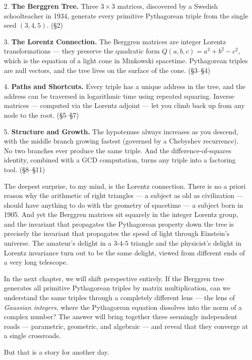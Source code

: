 \documentclass[12pt, letterpaper, openany]{book}
\theoremstyle{definition}
\theoremstyle{remark}
\begin{document}
2. \textbf{The Berggren Tree.} Three $3 \times 3$ matrices, discovered by a Swedish schoolteacher in 1934, generate every primitive Pythagorean triple from the single seed $(3, 4, 5)$. (§2)

3. \textbf{The Lorentz Connection.} The Berggren matrices are integer Lorentz transformations --- they preserve the quadratic form $Q(a, b, c) = a^2 + b^2 - c^2$, which is the equation of a light cone in Minkowski spacetime. Pythagorean triples are null vectors, and the tree lives on the surface of the cone. (§3--§4)

4. \textbf{Paths and Shortcuts.} Every triple has a unique address in the tree, and the address can be traversed in logarithmic time using repeated squaring. Inverse matrices --- computed via the Lorentz adjoint --- let you climb back up from any node to the root. (§5--§7)

5. \textbf{Structure and Growth.} The hypotenuse always increases as you descend, with the middle branch growing fastest (governed by a Chebyshev recurrence). No two branches ever produce the same triple. And the difference-of-squares identity, combined with a GCD computation, turns any triple into a factoring tool. (§8--§11)

The deepest surprise, to my mind, is the Lorentz connection. There is no a priori reason why the arithmetic of right triangles --- a subject as old as civilization --- should have anything to do with the geometry of spacetime --- a subject born in 1905. And yet the Berggren matrices sit squarely in the integer Lorentz group, and the invariant that propagates the Pythagorean property down the tree is precisely the invariant that propagates the speed of light through Einstein's universe. The amateur's delight in a $3$-$4$-$5$ triangle and the physicist's delight in Lorentz invariance turn out to be the same delight, viewed from different ends of a very long telescope.

In the next chapter, we will shift perspective entirely. If the Berggren tree generates all primitive Pythagorean triples by matrix multiplication, can we understand the same triples through a completely different lens --- the lens of \textit{Gaussian integers}, where the Pythagorean equation dissolves into the norm of a complex number? The answer will bring together three seemingly independent roads --- parametric, geometric, and algebraic --- and reveal that they converge at a single crossroads.

But that is a story for another day.
\end{document}
